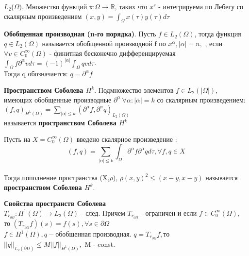 \documentclass[__main__.tex]{subfiles}
\begin{document}
\begin{definition}
\textbf{$L_{2}$}($\Omega)$. Множество функций x:$\Omega\rightarrow\mathbb{R}$, таких что $x^{r}$ - интегрируема по Лебегу со скалярным произведением $(x,y)=\int_{\Omega}x(\tau)y(\tau)d\tau$
\end{definition}

\begin{definition}
\textbf{Обобщенная производная (n-го порядка)}. Пусть $f\in L_{2}(\Omega)$, тогда функция $q \in L_{2}(\Omega)$ называется обобщенной производной f по $x^{\alpha},|\alpha|=n,$ , если $\forall v \in C_{0}^{\infty}(\Omega)$ - финитная бесконечно дифференцируемая\\
$\int_{\Omega}f\partial^{\alpha}v d\tau = (-1)^{|\alpha|}\int_{\Omega}qvd\tau$.\\
Тогда q обозначается: $q=\partial^{\alpha} f$ 
\end{definition}

\begin{definition}
\textbf{Пространством Соболева $H^k$}. Подмножество элементов $f\in L_{2}(|\Omega|),$ имеющих обобщенные производные $\partial^{\alpha}\ \forall \alpha: |\alpha|=k$ со скалярным произведением: \\
$(f,q)_{H^{k}(\Omega)}=\sum_{|\alpha|\leq k}(\partial^{\alpha}f,\partial^{\alpha}q)_{L_{2}(\Omega)}$\\
называется \textbf{пространством Соболева $H^k$}
\end{definition}

\begin{definition}
Пусть на $X=C_{0}^{\infty}(\Omega)$ введено скалярное произведение :\\
$$(f,q)=\sum_{|\alpha|\leq k}\int_{\Omega}\partial^{\alpha}f \partial^{\alpha}q d\tau,  \forall f,q\in X$$\\
Тогда пополнение пространства (X,$\rho$), $\rho(x,y)^{2}\leq(x-y,x-y)$ называется \textbf{пространством Соболева $H^k$}.  
\end{definition}

\textbf{Свойства пространств Соболева}\\
$T_{r_{\partial\Omega}}:H^{1}(\Omega)\rightarrow L_{2}(\Omega)$ - след. Причем  $T_{r_{\partial\Omega}}$ - ограничен и если $f\in C^{\infty}_{0}(\Omega),$ то 
$(T_{r_{\partial\Omega}}f)(s)=f(s),  \forall s\in \partial\Omega $\\
$f\in H^{1}(\Omega),  q-$обобщенная производная. $q=T_{r_{\partial\Omega}} f,$то $||q||_{L_{2}(\partial\Omega)}\leq M||f||_{H^{1}(\Omega)},$ M - const.
\end{document}
